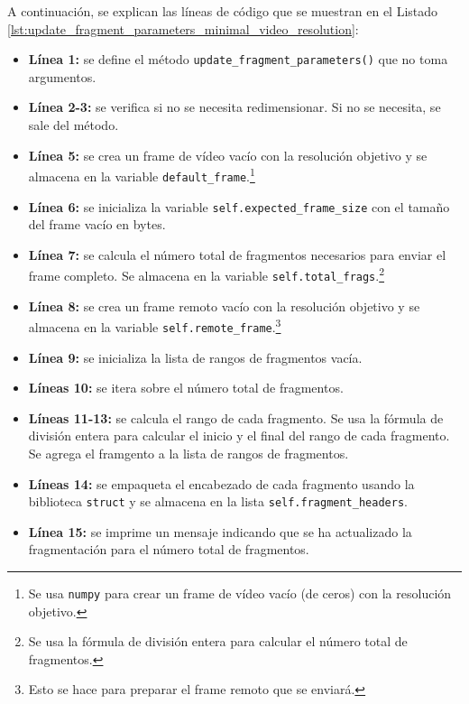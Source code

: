 A continuación, se explican las líneas de código que se muestran en el Listado \ref{lst:update_fragment_parameters_minimal_video_resolution}:
\begin{itemize}
    \item \textbf{Línea 1:} se define el método \texttt{update\_fragment\_parameters()} que no toma argumentos.
    \item \textbf{Línea 2-3:} se verifica si no se necesita redimensionar. Si no se necesita, se sale del método.
    \item \textbf{Línea 5:} se crea un frame de vídeo vacío con la resolución objetivo y se almacena en la variable \texttt{default\_frame}.\footnote{Se usa \texttt{numpy} para crear un frame de vídeo vacío (de ceros) con la resolución objetivo.}
    \item \textbf{Línea 6:} se inicializa la variable \texttt{self.expected\_frame\_size} con el tamaño del frame vacío en bytes.
    \item \textbf{Línea 7:} se calcula el número total de fragmentos necesarios para enviar el frame completo. Se almacena en la variable \texttt{self.total\_frags}.\footnote{Se usa la fórmula de división entera para calcular el número total de fragmentos.}
    \item \textbf{Línea 8:} se crea un frame remoto vacío con la resolución objetivo y se almacena en la variable \texttt{self.remote\_frame}.\footnote{Esto se hace para preparar el frame remoto que se enviará.}
    \item \textbf{Línea 9:} se inicializa la lista de rangos de fragmentos vacía.
    \item \textbf{Líneas 10:} se itera sobre el número total de fragmentos.
    \item \textbf{Líneas 11-13:} se calcula el rango de cada fragmento. Se usa la fórmula de división entera para calcular el inicio y el final del rango de cada fragmento. Se agrega el framgento a la lista de rangos de fragmentos.
    \item \textbf{Líneas 14:} se empaqueta el encabezado de cada fragmento usando la biblioteca \texttt{struct} y se almacena en la lista \texttt{self.fragment\_headers}.
    \item \textbf{Línea 15:} se imprime un mensaje indicando que se ha actualizado la fragmentación para el número total de fragmentos.
\end{itemize}
\vspace{\baselineskip}

